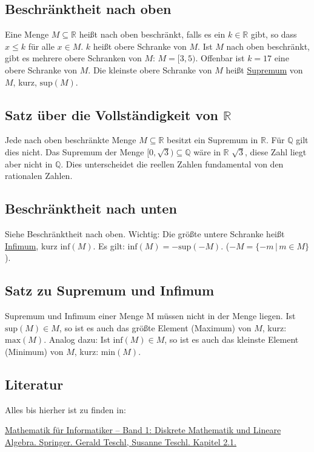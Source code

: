 \subsection{Beschränktheit nach oben}
Eine Menge $M \subseteq \mathbb{R}$ heißt nach oben beschränkt, falls es ein $k \in \mathbb{R}$ gibt, so dass $x \le k$ für alle $x \in M$. $k$ heißt obere Schranke von $M$. Ist $M$ nach oben beschränkt, gibt es mehrere obere Schranken von $M$: $M = [3,5)$. Offenbar ist $k = 17$ eine obere Schranke von $M$. Die kleinste obere Schranke von $M$ heißt \underline{Supremum} von $M$, kurz, $\text{sup}(M)$.

\subsection{Satz über die Vollständigkeit von $\mathbb{R}$}
Jede nach oben beschränkte Menge $M \subseteq \mathbb{R}$ besitzt ein Supremum in $\mathbb{R}$. Für $\mathbb{Q}$ gilt dies nicht. Das Supremum der Menge $[0,\sqrt{3}) \subseteq \mathbb{Q}$ wäre in $\mathbb{R}$ $\sqrt{3}$, diese Zahl liegt aber nicht in $\mathbb{Q}$. Dies unterscheidet die reellen Zahlen fundamental von den rationalen Zahlen.

\subsection{Beschränktheit nach unten}
Siehe Beschränktheit nach oben. Wichtig: Die größte untere Schranke heißt \underline{Infimum}, kurz $\text{inf}(M)$. Es gilt: $\text{inf}(M) = -\text{sup}(-M)$. ($-M = \{-m\,|\,m \in M\}$).

\subsection{Satz zu Supremum und Infimum} Supremum und Infimum einer Menge M müssen nicht in der Menge liegen. Ist $\text{sup}(M) \in M$, so ist es auch das größte Element (Maximum) von $M$, kurz: $\text{max}(M)$. Analog dazu: Ist $\text{inf}(M) \in M$, so ist es auch das kleinste Element (Minimum) von $M$, kurz: $\text{min}(M)$.

\subsection{Literatur}
Alles bis hierher ist zu finden in:

\href{http://www.mat.univie.ac.at/~gerald/ftp/book-mfi/mfi1.pdf}{Mathematik für Informatiker -- Band 1: Diskrete Mathematik und Lineare Algebra. Springer. Gerald Teschl, Susanne Teschl. Kapitel 2.1.}

